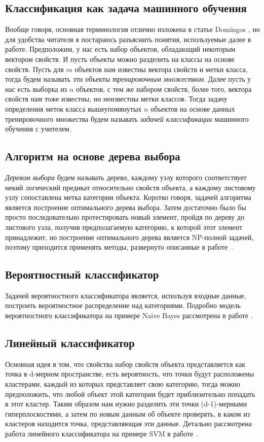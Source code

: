 \documentclass{article}
\begin{document}
\subsection{Классификация как задача машинного обучения}
Вообще говоря, основная терминология отлично изложена в статье Domingos \cite{fewUseful}, но для удобства читателя я постараюсь разъяснить понятия, используемые далее в работе.
Предположим, у нас есть набор объектов, обладающий некоторым вектором свойств. И пусть объекты можно разделить на классы на основе свойств. Пусть для $m$ объектов нам известны вектора свойств и метки класса, тогда будем называть эти объекты \emph{тренировочным множеством}. Далее пусть у нас есть выборка из $n$ объектов, с тем же набором свойств, более того, вектора свойств нам тоже известны, но неизвестны метки классов. Тогда задачу определения меток класса вышеупомянутых $n$ объектов на основе данных тренировочного множества будем называть \emph{задачей классификации} машинного обучения с учителем.
\subsection{Алгоритм на основе дерева выбора}
\emph{Деревом выбора} будем называть дерево, каждому узлу которого соответствует некий логический предикат относительно свойств объекта, а каждому листовому узлу сопоставлена метка категории объекта. Коротко говоря, задачей алгоритма является построение оптимального дерева выбора. Затем достаточно было бы просто последовательно протестировать новый элемент, пройдя по дереву до листового узла, получив предполагаемую категорию, к которой этот элемент принадлежит, но построение оптимального дерева является NP-полной задачей, поэтому приходится применять методы, развернуто описанные в работе~\cite{desicionTree}.
\subsection{Вероятностный классификатор}
Задачей вероятностного классификатора является, используя входные данные, построить вероятностное распределение над категориями. Подробно модель вероятностного классификатора на примере Naive Bayes рассмотрена в работе
\cite{murphy2006naive}.
\subsection{Линейный классификатор}
Основная идея в том, что свойства набор свойств объекта представляется как точка в d-мерном пространстве, есть вероятность, что точки будут расположены кластерами, каждый из которых представляет свою категорию, тогда можно предположить, что любой объект этой категории будет приблизительно попадать в этот кластер. Таким образом нам нужно разделить эти точки (d-1)-мерными гиперплоскостями, а затем по новым данным об объекте проверять, в каком из кластеров находится точка, представляющая эти данные. Детально рассмотрена работа линейного классификатора на примере SVM в работе~\cite{svm}.
\end{document}
